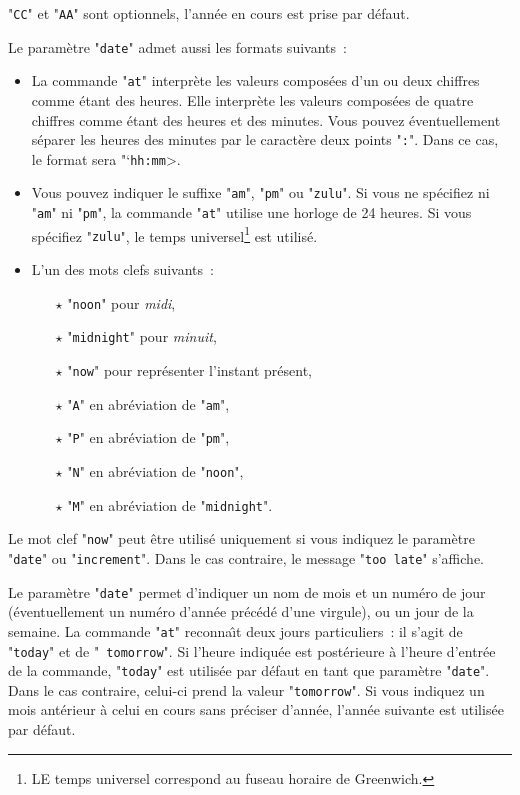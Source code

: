 "{\tt CC}" et "{\tt AA}" sont optionnels, l'ann{\'e}e en cours est prise par d{\'e}faut.

Le param{\`e}tre "{\tt date}" admet aussi les formats suivants~:
\begin{itemize}
	\item	La commande "{\tt at}" interpr{\`e}te les valeurs compos{\'e}es d'un ou deux chiffres
			comme {\'e}tant des heures. Elle interpr{\`e}te les valeurs compos{\'e}es de quatre chiffres
			comme {\'e}tant des heures et des minutes. Vous pouvez {\'e}ventuellement s{\'e}parer les heures
			des minutes par le caract{\`e}re deux points "{\tt :}". Dans ce cas, le format sera
			"{`}{\tt hh:mm}>.
	\item	Vous pouvez indiquer le suffixe "{\tt am}", "{\tt pm}" ou "{\tt zulu}".
			Si vous ne sp{\'e}cifiez ni "{\tt am}" ni "{\tt pm}", la commande "{\tt at}"
			utilise une horloge de 24 heures. Si vous sp{\'e}cifiez "{\tt zulu}", le temps 
			universel\footnote{LE temps universel correspond au fuseau horaire de Greenwich.}
			est utilis{\'e}.
	\item	L'un des mots clefs suivants~:
		\begin{itemize}
			\item[$\star$]	"{\tt noon}" pour {\sl midi},
			\item[$\star$]	"{\tt midnight}" pour {\sl minuit},
			\item[$\star$]	"{\tt now}" pour repr{\'e}senter l'instant pr{\'e}sent,
			\item[$\star$]	"{\tt A}" en abr{\'e}viation de "{\tt am}",
			\item[$\star$]	"{\tt P}" en abr{\'e}viation de "{\tt pm}", 
			\item[$\star$]	"{\tt N}" en abr{\'e}viation de "{\tt noon}",
			\item[$\star$]	"{\tt M}" en abr{\'e}viation de "{\tt midnight}".
		\end{itemize}
\end{itemize}

\begin{remarque}
	Le mot clef "{\tt now}" peut {\^e}tre utilis{\'e} uniquement si vous indiquez le param{\`e}tre
	"{\tt date}" ou "{\tt increment}". Dans le cas contraire, le message 
	"{\tt too late}" s'affiche.
\end{remarque}

Le param{\`e}tre "{\tt date}" permet d'indiquer un nom de mois et un
num{\'e}ro de jour ({\'e}ventuellement un num{\'e}ro d'ann{\'e}e pr{\'e}c{\'e}d{\'e} d'une virgule),
ou un jour de la semaine. La commande "{\tt at}" reconna{\^\i}t deux
jours particuliers~: il s'agit de "{\tt today}" et de "{\tt
tomorrow}". Si l'heure indiqu{\'e}e est post{\'e}rieure {\`a} l'heure d'entr{\'e}e de
la commande, "{\tt today}" est utilis{\'e}e par d{\'e}faut en tant que
param{\`e}tre "{\tt date}". Dans le cas contraire, celui-ci prend la
valeur "{\tt tomorrow}". Si vous indiquez un mois ant{\'e}rieur {\`a} celui
en cours sans pr{\'e}ciser d'ann{\'e}e, l'ann{\'e}e suivante est utilis{\'e}e par
d{\'e}faut.

